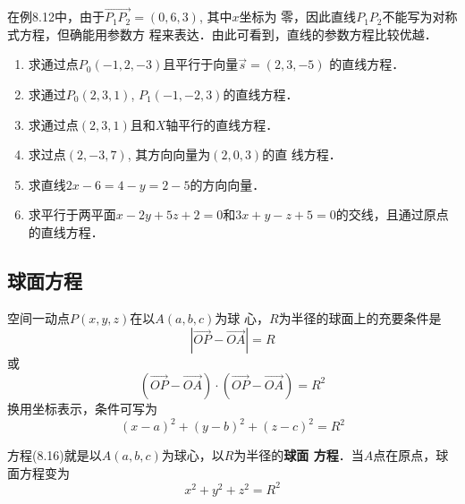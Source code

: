 在例8.12中，由于$\Vec{P_1P_2}=(0,6,3)$, 其中$x$坐标为
零，因此直线$P_1P_2$不能写为对称式方程，但确能用参数方
程来表达．由此可看到，直线的参数方程比较优越．


\begin{ex}
\begin{enumerate}
    \item 求通过点$P_0(-1,2,-3)$且平行于向量$\vec{s}=(2,3,-5)$
    的直线方程．
    \item 求通过$P_0(2,3,1)$, $P_1(-1,-2,3)$的直线方程．
    \item 求通过点$(2,3,1)$且和$X$轴平行的直线方程．
    \item 求过点$(2,-3,7)$, 其方向向量为$(2,0,3)$的直
    线方程．
    \item 求直线$2x-6=4-y=2-5$的方向向量．
    \item 求平行于两平面$x-2y+5z+2=0$和$3x+y-z
    +5=0$的交线，且通过原点的直线方程．
\end{enumerate}
\end{ex}


\subsection{球面方程}
空间一动点$P(x,y,z)$在以$A(a,b,c)$为球
心，$R$为半径的球面上的充要条件是
\[|\Vec{OP}-\Vec{OA}|=R\]
或
\[(\Vec{OP}-\Vec{OA})\cdot (\Vec{OP}-\Vec{OA})=R^2\]
换用坐标表示，条件可写为
\begin{equation}
    (x-a)^2+(y-b)^2+(z-c)^2=R^2
\end{equation}

\begin{figure}[htp]
    \centering
{}
    \caption{}
\end{figure}


方程(8.16)就是以$A(a,b,c)$为球心，以$R$为半径的\textbf{球面
方程}．当$A$点在原点，球面方程变为
\[    x^2+y^2+z^2=R^2\]




